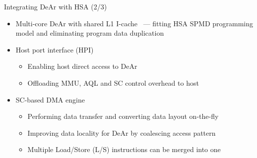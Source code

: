 \documentclass{beamer}
\begin{document}
\begin{CJK}{UTF8}{bkai}
            \begin{frame}{Integrating DeAr with HSA (2/3)}
                \begin{itemize}
                    \item <2-> {Multi-core DeAr with shared L1 I-cache~\cite{kelly2004shared} --- fitting HSA SPMD programming model and eliminating program data duplication}
                    \item <3-> {Host port interface (HPI)~\cite{hpi}
                            \begin{itemize}
                                \item Enabling host direct access to DeAr
                                \item Offloading MMU, AQL and SC control overhead to host
                            \end{itemize}
                        }
                    \item <4-> {SC-based DMA engine~\cite{sc}
                            \begin{itemize}
                                \item Performing data transfer and converting data layout on-the-fly
                                \item Improving data locality for DeAr by coalescing access pattern
                                \item Multiple Load/Store (L/S) instructions can be merged into one
                            \end{itemize}
                        }
                \end{itemize}
            \end{frame}


\end{CJK}
\end{document}
